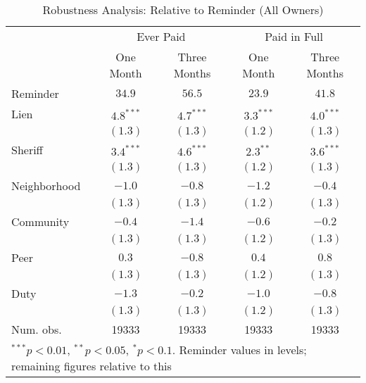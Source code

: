 \begin{appendices}
\begin{table}[htbp]
\caption{Robustness Analysis: Relative to Reminder (All Owners)}\label{sh_lpm_mult}
\begin{center}
\begin{tabular}{l c c c c }
\hline
 & \multicolumn{2}{c}{Ever Paid} & \multicolumn{2}{c}{Paid in Full} \\
 & One Month & Three Months & One Month & Three Months \\
Reminder     & $34.9$ & $56.5$ & $23.9$ & $41.8$ \\
\hline
Lien         & $4.8^{***}$  & $4.7^{***}$  & $3.3^{***}$  & $4.0^{***}$  \\
             & $(1.3)$      & $(1.3)$      & $(1.2)$      & $(1.3)$      \\
Sheriff      & $3.4^{***}$  & $4.6^{***}$  & $2.3^{**}$   & $3.6^{***}$  \\
             & $(1.3)$      & $(1.3)$      & $(1.2)$      & $(1.3)$      \\
Neighborhood & $-1.0$       & $-0.8$       & $-1.2$       & $-0.4$       \\
             & $(1.3)$      & $(1.3)$      & $(1.2)$      & $(1.3)$      \\
Community    & $-0.4$       & $-1.4$       & $-0.6$       & $-0.2$       \\
             & $(1.3)$      & $(1.3)$      & $(1.2)$      & $(1.3)$      \\
Peer         & $0.3$        & $-0.8$       & $0.4$        & $0.8$        \\
             & $(1.3)$      & $(1.3)$      & $(1.2)$      & $(1.3)$      \\
Duty         & $-1.3$       & $-0.2$       & $-1.0$       & $-0.8$       \\
             & $(1.3)$      & $(1.3)$      & $(1.2)$      & $(1.3)$      \\
\hline
Num. obs.    & 19333        & 19333        & 19333        & 19333        \\
\hline
\multicolumn{5}{l}{\scriptsize{$^{***}p<0.01$, $^{**}p<0.05$, $^*p<0.1$. Reminder values in levels; remaining figures relative to this}}
\end{tabular}
\end{center}
\end{table}


\end{appendices}
